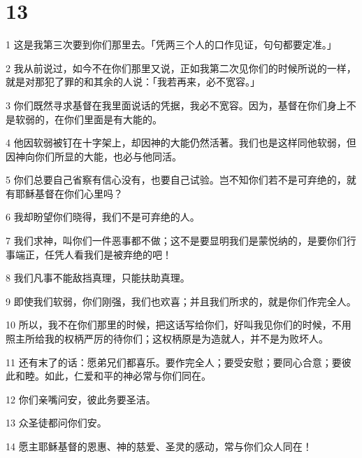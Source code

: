\chapter{13}

\par 1 这是我第三次要到你们那里去。「凭两三个人的口作见证，句句都要定准。」
\par 2 我从前说过，如今不在你们那里又说，正如我第二次见你们的时候所说的一样，就是对那犯了罪的和其余的人说：「我若再来，必不宽容。」
\par 3 你们既然寻求基督在我里面说话的凭据，我必不宽容。因为，基督在你们身上不是软弱的，在你们里面是有大能的。
\par 4 他因软弱被钉在十字架上，却因神的大能仍然活著。我们也是这样同他软弱，但因神向你们所显的大能，也必与他同活。
\par 5 你们总要自己省察有信心没有，也要自己试验。岂不知你们若不是可弃绝的，就有耶稣基督在你们心里吗？
\par 6 我却盼望你们晓得，我们不是可弃绝的人。
\par 7 我们求神，叫你们一件恶事都不做；这不是要显明我们是蒙悦纳的，是要你们行事端正，任凭人看我们是被弃绝的吧！
\par 8 我们凡事不能敌挡真理，只能扶助真理。
\par 9 即使我们软弱，你们刚强，我们也欢喜；并且我们所求的，就是你们作完全人。
\par 10 所以，我不在你们那里的时候，把这话写给你们，好叫我见你们的时候，不用照主所给我的权柄严厉的待你们；这权柄原是为造就人，并不是为败坏人。
\par 11 还有末了的话：愿弟兄们都喜乐。要作完全人；要受安慰；要同心合意；要彼此和睦。如此，仁爱和平的神必常与你们同在。
\par 12 你们亲嘴问安，彼此务要圣洁。
\par 13 众圣徒都问你们安。
\par 14 愿主耶稣基督的恩惠、神的慈爱、圣灵的感动，常与你们众人同在！


